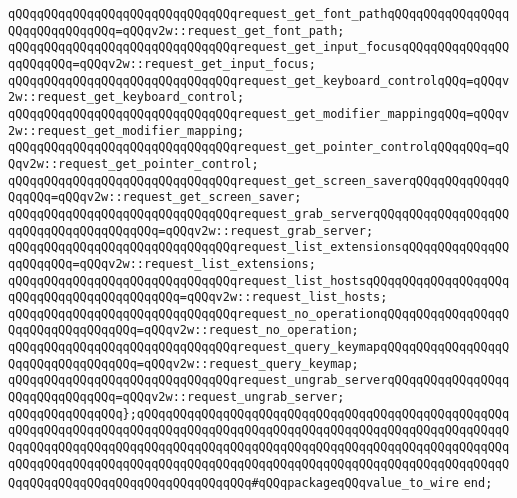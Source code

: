 \newline
\verb|qQQqqQQqqQQqqQQqqQQqqQQqqQQqqQQqrequest_get_font_pathqQQqqQQqqQQqqQQqqQQqqQQqqQQqqQQq=qQQqv2w::request_get_font_path;|\newline
\verb|qQQqqQQqqQQqqQQqqQQqqQQqqQQqqQQqrequest_get_input_focusqQQqqQQqqQQqqQQqqQQqqQQq=qQQqv2w::request_get_input_focus;|\newline
\verb|qQQqqQQqqQQqqQQqqQQqqQQqqQQqqQQqrequest_get_keyboard_controlqQQq=qQQqv2w::request_get_keyboard_control;|\newline
\verb|qQQqqQQqqQQqqQQqqQQqqQQqqQQqqQQqrequest_get_modifier_mappingqQQq=qQQqv2w::request_get_modifier_mapping;|\newline
\verb|qQQqqQQqqQQqqQQqqQQqqQQqqQQqqQQqrequest_get_pointer_controlqQQqqQQq=qQQqv2w::request_get_pointer_control;|\newline
\verb|qQQqqQQqqQQqqQQqqQQqqQQqqQQqqQQqrequest_get_screen_saverqQQqqQQqqQQqqQQqqQQq=qQQqv2w::request_get_screen_saver;|\newline
\verb|qQQqqQQqqQQqqQQqqQQqqQQqqQQqqQQqrequest_grab_serverqQQqqQQqqQQqqQQqqQQqqQQqqQQqqQQqqQQqqQQq=qQQqv2w::request_grab_server;|\newline
\verb|qQQqqQQqqQQqqQQqqQQqqQQqqQQqqQQqrequest_list_extensionsqQQqqQQqqQQqqQQqqQQqqQQq=qQQqv2w::request_list_extensions;|\newline
\verb|qQQqqQQqqQQqqQQqqQQqqQQqqQQqqQQqrequest_list_hostsqQQqqQQqqQQqqQQqqQQqqQQqqQQqqQQqqQQqqQQqqQQq=qQQqv2w::request_list_hosts;|\newline
\verb|qQQqqQQqqQQqqQQqqQQqqQQqqQQqqQQqrequest_no_operationqQQqqQQqqQQqqQQqqQQqqQQqqQQqqQQqqQQq=qQQqv2w::request_no_operation;|\newline
\verb|qQQqqQQqqQQqqQQqqQQqqQQqqQQqqQQqrequest_query_keymapqQQqqQQqqQQqqQQqqQQqqQQqqQQqqQQqqQQq=qQQqv2w::request_query_keymap;|\newline
\verb|qQQqqQQqqQQqqQQqqQQqqQQqqQQqqQQqrequest_ungrab_serverqQQqqQQqqQQqqQQqqQQqqQQqqQQqqQQq=qQQqv2w::request_ungrab_server;|\newline
\newline
\verb|qQQqqQQqqQQqqQQq};qQQqqQQqqQQqqQQqqQQqqQQqqQQqqQQqqQQqqQQqqQQqqQQqqQQqqQQqqQQqqQQqqQQqqQQqqQQqqQQqqQQqqQQqqQQqqQQqqQQqqQQqqQQqqQQqqQQqqQQqqQQqqQQqqQQqqQQqqQQqqQQqqQQqqQQqqQQqqQQqqQQqqQQqqQQqqQQqqQQqqQQqqQQqqQQqqQQqqQQqqQQqqQQqqQQqqQQqqQQqqQQqqQQqqQQqqQQqqQQqqQQqqQQqqQQqqQQqqQQqqQQqqQQqqQQqqQQqqQQqqQQqqQQqqQQqqQQq#qQQqpackageqQQqvalue_to_wire|\newline
\verb|end;|\newline
\newline
\newline
\newline
\newline
\newline

